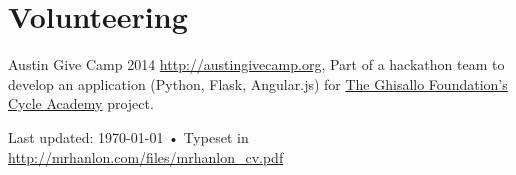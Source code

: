 \documentclass[10pt, a4paper]{article}
\begin{document}
\section*{Volunteering}
Austin Give Camp 2014 \href{http://austingivecamp.org}{http://austingivecamp.org}, Part of a hackathon team to develop an application (Python, Flask, Angular.js) for \href{http://ghisallo.org/}{The Ghisallo Foundation's} \href{http://cycleacademy.org/}{Cycle Academy} project.\\

\vfill{}

\begin{center}
{\scriptsize  Last updated: \today\- •\-
Typeset in \href{http://nitens.org/taraborelli/cvtex}{
\XeTeX }\\
\href{http://mrhanlon.com/files/mrhanlon_cv.pdf}{http://mrhanlon.com/files/mrhanlon\_cv.pdf}}
\end{center}
\end{document}
